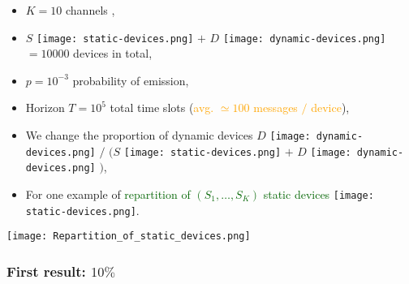 \begin{frameO}


        \begin{itemize}
            \item
                \(K = 10\) channels \slotmachine,
            \item
                \(S\) \texttt{[image: static-devices.png]}
                \(+\)
                \(D\) \texttt{[image: dynamic-devices.png]}
                \(= 10000\) devices
                in total,
            \pause
            \item
                \(p = 10^{-3}\) probability of emission,
            \item
                Horizon \(T = 10^5\) total time slots
                (\textcolor{orange}{avg. \(\simeq 100\) messages \(/\) device}),
            \pause
            \item
                We change the proportion of dynamic devices
                \(D\)
                \texttt{[image: dynamic-devices.png]}
                \(/\)
                \((S\)
                \texttt{[image: static-devices.png]}
                \(+\)
                \(D\)
                \texttt{[image: dynamic-devices.png]}
                \()\),
            \item
                For one example of \textcolor{darkgreen}{repartition of \((S_1,\dots,S_{K})\) static devices} \texttt{[image: static-devices.png]}.
        \end{itemize}
        \vspace*{-10pt}
        \begin{center}
            \texttt{[image: Repartition\_of\_static\_devices.png]}
        \end{center}


\end{frameO}



\subsubsection{First result: $10\%$}

